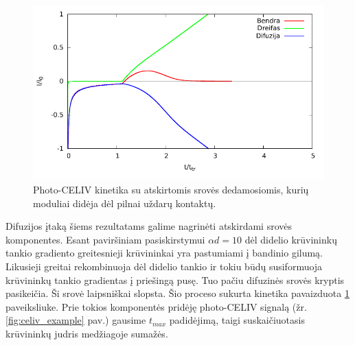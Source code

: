 \begin{figure}[ht]
  \centering
	\includegraphics{./media/pdf/separate.pdf}
  \caption{Photo-CELIV kinetika su atskirtomis srovės dedamosiomis, kurių moduliai didėja dėl pilnai uždarų kontaktų.}
  \label{fig:separate}
\end{figure}

Difuzijos įtaką šiems rezultatams galime nagrinėti atskirdami srovės komponentes. Esant paviršiniam pasiskirstymui $\alpha d = 10$ dėl didelio krūvininkų tankio gradiento greitesnieji krūvininkai yra pastumiami į bandinio gilumą. Likusieji greitai rekombinuoja dėl didelio tankio ir tokiu būdų susiformuoja krūvininkų tankio gradientas į priešingą pusę. Tuo pačiu difuzinės srovės kryptis pasikeičia. Ši srovė laipsniškai slopsta. Šio proceso sukurta kinetika pavaizduota \ref{fig:separate} paveiksliuke. Prie tokios komponentės pridėję photo-CELIV signalą (žr. \ref{fig:celiv_example} pav.) gausime $t_{max}$ padidėjimą, taigi suskaičiuotasis krūvininkų judris medžiagoje sumažės.
